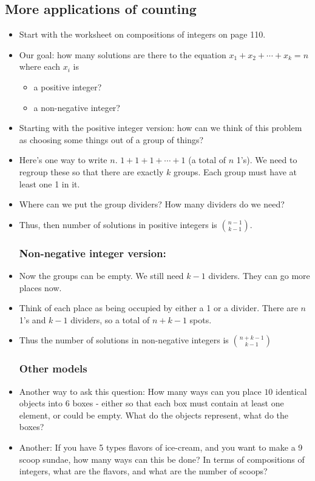\subsection*{More applications of counting}

\begin{itemize}
  \item Start with the worksheet on compositions of integers on page 110.
  \item Our goal: how many solutions are there to the equation $x_1 + x_2 + \cdots + x_k = n$ where each $x_i$ is
  \begin{itemize}
    \item a positive integer?
    \item a non-negative integer?
  \end{itemize}
  \item Starting with the positive integer version: how can we think of this problem as choosing some things out of a group of things?
  \item Here's one way to write $n$.  $1+1+1+\cdots+1$ (a total of $n$ 1's).  We need to regroup these so that there are exactly $k$ groups.  Each group must have at least one 1 in it.
  \item Where can we put the group dividers?  How many dividers do we need?
  \item Thus, then number of solutions in positive integers is ${n-1 \choose k-1}$.
  \subsubsection*{Non-negative integer version:}
  \item Now the groups can be empty.  We still need $k-1$ dividers.  They can go more places now.  
  \item Think of each place as being occupied by either a 1 or a divider.  There are $n$ 1's and $k-1$ dividers, so a total of $n + k - 1$ spots.  
  \item Thus the number of solutions in non-negative integers is ${n+k-1 \choose k-1}$
  \subsubsection*{Other models}
  \item Another way to ask this question: How many ways can you place $10$ identical objects into $6$ boxes - either so that each box must contain at least one element, or could be empty.  What do the objects represent, what do the boxes?
  \item Another: If you have 5 types flavors of ice-cream, and you want to make a 9 scoop sundae, how many ways can this be done?  In terms of compositions of integers, what are the flavors, and what are the number of scoops?

\end{itemize}
